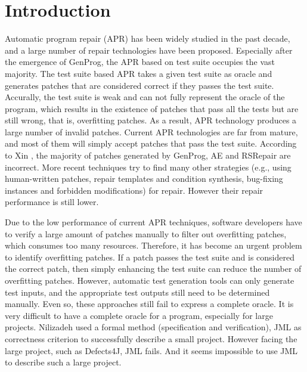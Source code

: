 \documentclass[sn-basic]{sn-jnl}
\theoremstyle{thmstyleone}
\theoremstyle{thmstyletwo}
\theoremstyle{thmstylethree}
\begin{document}



\maketitle
\section{Introduction}\label{sec1}

Automatic program repair (APR) has been widely studied in the past decade, and a large number of repair technologies have been proposed. Especially after the emergence of GenProg\citep{bib1}, the APR based on test suite occupies the vast majority. The test suite based APR takes a given test suite as oracle and generates patches that are considered correct if they passes the test suite. Accurally, the test suite is weak and can not fully represent the oracle of the program, which results in the existence of patches that pass all the tests but are still wrong, that is, overfitting patches. As a result, APR technology produces a large number of invalid patches. Current APR technologies are far from mature, and most of them will simply accept patches that pass the test suite. According to Xin \citeyearpar{bib5}, the majority of patches generated by GenProg, AE  and RSRepair are incorrect. More recent techniques try to find many other strategies (e.g., using human-written patches, repair templates and condition synthesis, bug-fixing instances  and forbidden modifications) for repair. However their  repair performance is still lower.

Due to the low performance of current APR techniques,  software developers have to verify a large amount of patches manually to filter out overfitting patches, which consumes too many resources.  Therefore, it has become an urgent problem to identify overfitting patches. If a patch passes the test suite and is considered the correct patch, then simply enhancing the test suite can reduce the number of overfitting patches. However, automatic test generation tools can only generate test inputs, and the appropriate test outputs still need to be determined manually. Even so, these approaches still fail to express a complete oracle. It is very difficult to have a complete oracle for a program, especially for large projects. Nilizadeh\citeyearpar{bib7} used a formal method (specification and verification), JML as correctness criterion to successfully describe a small  project. However facing the large project, such as Defects4J\citep{bib49}, JML fails. And it seems impossible to use JML to describe such a large project.
\end{document}
